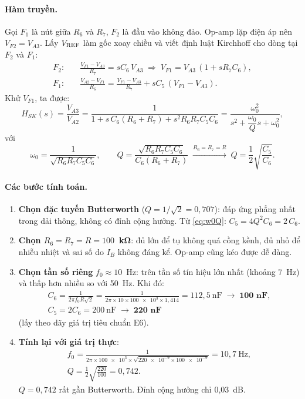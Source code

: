 \paragraph{Hàm truyền.} Gọi $F_1$ là nút giữa $R_6$ và $R_7$, $F_2$ là đầu vào không đảo. Op-amp lặp điện áp nên $V_{F2} = V_{A3}$. Lấy $V_\mathrm{REF}$ làm gốc xoay chiều và viết định luật Kirchhoff cho dòng tại $F_2$ và $F_1$:
\begin{align*}
  F_2:&\quad \frac{V_{F1}-V_{A3}}{R_7} = sC_6\,V_{A3} \;\Rightarrow\; V_{F1} = V_{A3}\,(1+sR_7C_6),\\
  F_1:&\quad \frac{V_{A2}-V_{F1}}{R_6} = \frac{V_{F1}-V_{A3}}{R_7} + sC_5\,(V_{F1}-V_{A3}).
\end{align*}
Khử $V_{F1}$, ta được:
\begin{equation}
  H_{SK}(s) = \frac{V_{A3}}{V_{A2}} = \frac{1}{1 + s\,C_6(R_6+R_7) + s^2 R_6R_7C_5C_6}
  = \frac{\omega_0^2}{s^2 + \dfrac{\omega_0}{Q}s + \omega_0^2},
  \label{eq:HSK}
\end{equation}
với
\begin{equation}
  \omega_0 = \frac{1}{\sqrt{R_6R_7C_5C_6}},\qquad
  Q = \frac{\sqrt{R_6R_7C_5C_6}}{C_6(R_6+R_7)} \;\xrightarrow{R_6=R_7=R}\; Q = \frac{1}{2}\sqrt{\frac{C_5}{C_6}} .
  \label{eq:w0Q}
\end{equation}

\paragraph{Các bước tính toán.}
\begin{enumerate}
  \item \textbf{Chọn đặc tuyến Butterworth} ($Q = 1/\sqrt2 = 0{,}707$): đáp ứng phẳng nhất trong dải thông, không có đỉnh cộng hưởng. Từ \eqref{eq:w0Q}: $C_5 = 4Q^2 C_6 = 2\,C_6$.
  \item \textbf{Chọn $R_6 = R_7 = R = 100$~kΩ}: đủ lớn để tụ không quá cồng kềnh, đủ nhỏ để nhiễu nhiệt và sai số do $I_B$ không đáng kể. Op-amp cũng kéo được dễ dàng.
  \item \textbf{Chọn tần số riêng} $f_0 \approx 10$~Hz: trên tần số tín hiệu lớn nhất (khoảng 7~Hz) và thấp hơn nhiều so với 50~Hz. Khi đó:
  \begin{gather*}
    C_6 = \frac{1}{2\pi f_0 R\sqrt2} = \frac{1}{2\pi\times10\times\num{100e3}\times1{,}414} = 112{,}5~\text{nF} \;\rightarrow\; \textbf{100~nF},\\
    C_5 = 2C_6 = 200~\text{nF} \;\rightarrow\; \textbf{220~nF}
  \end{gather*}
  (lấy theo dãy giá trị tiêu chuẩn E6).
  \item \textbf{Tính lại với giá trị thực}:
  \begin{gather*}
    f_0 = \frac{1}{2\pi\times\num{100e3}\times\sqrt{\num{220e-9}\times\num{100e-9}}} = 10{,}7~\text{Hz},\\
    Q = \frac12\sqrt{\frac{220}{100}} = 0{,}742 .
  \end{gather*}
  $Q = 0{,}742$ rất gần Butterworth. Đỉnh cộng hưởng chỉ 0,03~dB.
\end{enumerate}

